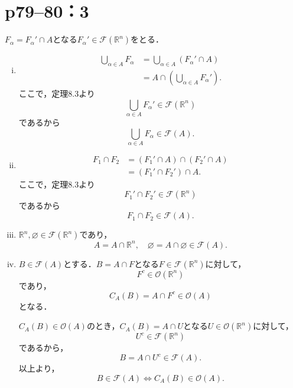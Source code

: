 \section*{p79--80：3} \label{p79--80：3}
\begin{tproof}
    $F_\alpha = F_{\alpha} ' \cap A$となる$F_{\alpha} ' \in \mathcal{F} (\mathbb{R}^n)$をとる．
    \begin{enumerate}[(i)]
        \item
              \begin{align*}
                  \bigcup_{\alpha \in A} F_\alpha & = \bigcup_{\alpha \in A} (F_{\alpha} ' \cap A)  \\
                                                  & = A \cap (\bigcup_{\alpha \in A} F_{\alpha} ').
              \end{align*}
              ここで，定理8.3より
              \[
                  \bigcup_{\alpha \in A} F_{\alpha} ' \in \mathcal{F} (\mathbb{R}^n)
              \]
              であるから
              \[
                  \bigcup_{\alpha \in A} F_\alpha \in \mathcal{F} (A).
              \]
        \item
              \begin{align*}
                  F_1 \cap F_2 & = (F_1 ' \cap A) \cap (F_2 ' \cap A) \\
                               & = (F_1 ' \cap F_2 ') \cap A.
              \end{align*}
              ここで，定理8.3より
              \[
                  F_1 ' \cap F_2 ' \in \mathcal{F} (\mathbb{R}^n)
              \]
              であるから
              \[
                  F_1 \cap F_2 \in \mathcal{F} (A).
              \]
        \item
              $\mathbb{R}^n, \varnothing \in \mathcal{F} (\mathbb{R}^n)$であり，
              \[
                  A = A \cap \mathbb{R}^n, \quad \varnothing = A \cap \varnothing \in \mathcal{F} (A).
              \]
        \item $B \in \mathcal{F} (A)$とする．$B =  A \cap F$となる$F \in \mathcal{F} (\mathbb{R}^n)$に対して，
              \[
                  F^c\in \mathcal{O} (\mathbb{R}^n)
              \]
              であり，
              \[
                  C_A (B) = A \cap F^c \in \mathcal{O} (A)
              \]
              となる．

              $C_A (B) \in \mathcal{O}(A)$のとき，$C_A (B) = A \cap U$となる$U \in \mathcal{O} (\mathbb{R}^n)$に対して，
              \[
                  U^c \in \mathcal{F} (\mathbb{R}^n)
              \]
              であるから，
              \[
                  B = A \cap U^c \in \mathcal{F} (A).
              \]
              以上より，
              \[
                  B \in \mathcal{F} (A) \iff C_A (B) \in \mathcal{O} (A).
              \]
    \end{enumerate}
\end{tproof}


